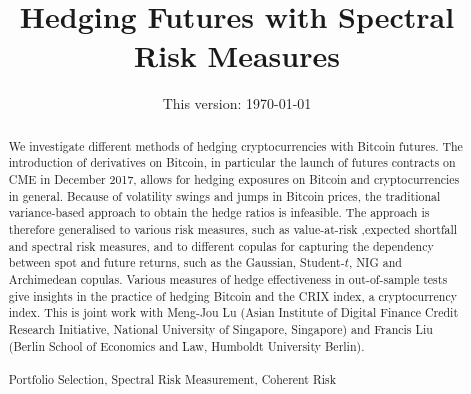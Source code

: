 \documentclass[11pt,a4paper,english]{article}
\title{\LARGE \bf Hedging Futures with Spectral Risk Measures}
\date{This version: \today}
\begin{document}
\newtheorem{lemma}{Lemma}
\newtheorem {proposition}[lemma]{Proposition}
\newtheorem {corollary}{Corollary}
\newtheorem {theorem}{Theorem}
\newtheorem{claim}[lemma]{Claim}
\newtheorem{comment}[lemma]{Comment}
\newtheorem{example}[lemma]{Example}
\newtheorem{fact}[lemma]{Fact}
\newtheorem{defn}[lemma]{Definition}
\newtheorem{exercise}{Exercise}[section]

\newtheorem{programming}[exercise]{Programming assignment}
\newenvironment{proof}{{\flushleft\textbf{\textsl{Proof.\ \ }}}}{\hfill{\hfill\rule{2mm}{2mm}}}
\maketitle
\begin{abstract}
\footnotesize{ We investigate different methods of hedging cryptocurrencies with Bitcoin futures.
The introduction of derivatives on Bitcoin, in particular the launch of futures contracts on CME in December 2017,
allows for hedging exposures on Bitcoin and cryptocurrencies in general.
Because of volatility swings and jumps in Bitcoin prices, the traditional variance-based approach to obtain the hedge ratios is infeasible.
The approach is therefore generalised  to various risk measures, such as value-at-risk ,expected shortfall and spectral risk measures,
and to different copulas for capturing the dependency between spot and future returns, such as the Gaussian, Student-$t$,
NIG and Archimedean copulas. Various measures of hedge effectiveness in out-of-sample tests give insights in the practice of hedging Bitcoin and the CRIX index,
a cryptocurrency index. This is joint work with Meng-Jou Lu (Asian Institute of Digital Finance Credit Research Initiative,
National University of Singapore, Singapore) and Francis Liu (Berlin School of Economics and Law, Humboldt University Berlin).\\

  \\
 Portfolio Selection, Spectral Risk Measurement,  Coherent Risk}\pagestyle{empty}\\
\end{abstract}


\clearpage
\end{document}
